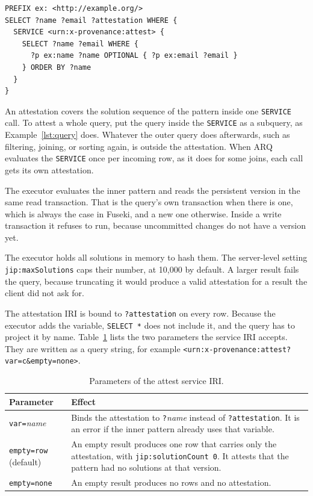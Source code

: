 \documentclass[11pt,a4paper]{article}
\newcommand{\code}[1]{\texttt{#1}}
\begin{document}
\begin{lstlisting}[language=SPARQL, caption={An attested query. Every row gets the attestation IRI in \code{?attestation}.}, label={lst:query}]
PREFIX ex: <http://example.org/>
SELECT ?name ?email ?attestation WHERE {
  SERVICE <urn:x-provenance:attest> {
    SELECT ?name ?email WHERE {
      ?p ex:name ?name OPTIONAL { ?p ex:email ?email }
    } ORDER BY ?name
  }
}
\end{lstlisting}

An attestation covers the solution sequence of the pattern inside one \code{SERVICE} call. To
attest a whole query, put the query inside the \code{SERVICE} as a subquery, as
Example~\ref{lst:query} does. Whatever the outer query does afterwards, such as filtering,
joining, or sorting again, is outside the attestation. When ARQ evaluates the \code{SERVICE}
once per incoming row, as it does for some joins, each call gets its own attestation.

The executor evaluates the inner pattern and reads the persistent version in the same read
transaction. That is the query's own transaction when there is one, which is always the case
in Fuseki, and a new one otherwise. Inside a write transaction it refuses to run, because
uncommitted changes do not have a version yet.

The executor holds all solutions in memory to hash them. The server-level setting
\code{jip:maxSolutions} caps their number, at 10,000 by default. A larger result fails the
query, because truncating it would produce a valid attestation for a result the client did not
ask for.

The attestation IRI is bound to \code{?attestation} on every row. Because the executor adds the
variable, \code{SELECT *} does not include it, and the query has to project it by name.
Table~\ref{tab:params} lists the two parameters the service IRI accepts. They are written
as a query string, for example \code{<urn:x-provenance:attest?var=c\&empty=none>}.

\begin{table}[ht]
\centering
\caption{Parameters of the attest service IRI.}
\label{tab:params}
\small
\begin{tabularx}{\linewidth}{@{}>{\raggedright\arraybackslash}p{38mm}>{\raggedright\arraybackslash}X@{}}
\toprule
Parameter & Effect \\
\midrule
\code{var=}\textit{name} & Binds the attestation to \code{?}\textit{name} instead of
\code{?attestation}. It is an error if the inner pattern already uses that variable. \\
\code{empty=row} (default) & An empty result produces one row that carries only the
attestation, with \code{jip:solutionCount 0}. It attests that the pattern had no solutions
at that version. \\
\code{empty=none} & An empty result produces no rows and no attestation. \\
\bottomrule
\end{tabularx}
\end{table}
\end{document}
